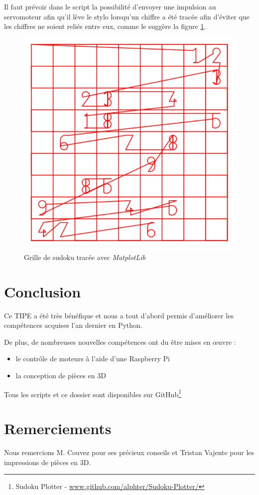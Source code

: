 \documentclass[12pt,a4paper]{report}
\begin{document}
Il faut prévoir dans le script la possibilité d'envoyer une impulsion au servomoteur afin qu'il lève le stylo lorsqu'un chiffre a été tracée afin d'éviter que les chiffres ne soient reliés entre eux, comme le suggère la figure \ref{sudoku_trace}.

\begin{figure}[!h]
 \center
 \includegraphics[scale=0.45]{../pictures/Sudoku_relies}
 \caption{Grille de sudoku tracée avec \emph{MatplotLib}}
 \label{sudoku_trace}
\end{figure}

\chapter*{Conclusion}
Ce TIPE a été très bénéfique et nous a tout d'abord permis d'améliorer les compétences acquises l'an dernier en Python.

De plus, de nombreuses nouvelles compétences ont du être mises en œuvre :

\begin{itemize}[label=--]
\item le contrôle de moteurs à l'aide d'une Raspberry Pi
\item la conception de pièces en 3D

\end{itemize}
Tous les scripts et ce dossier sont disponibles sur GitHub\footnote{Sudoku Plotter - \url{www.github.com/alphter/Sudoku-Plotter/}}

\chapter*{Remerciements}

Nous remercions M. Couvez pour ses précieux conseils et Tristan Vajente pour les impressions de pièces en 3D.

%
\end{document}

